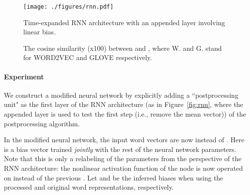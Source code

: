 \documentclass{article} \usepackage{acl2017,times}
\begin{document}
{\begin{figure}[htbp]
\begin{minipage}{0.48\textwidth}
\centering
\texttt{[image: ./figures/rnn.pdf]}
\caption{Time-expanded RNN architecture with an appended layer involving linear bias. \label{fig:rnn}}
\end{minipage}
\begin{minipage}{0.48\textwidth}
\centering
{}
\caption{The cosine similarity (x100) between  and  , where W. and G. stand for WORD2VEC and GLOVE respectively.}
\label{tb:biases}
\end{minipage}
\end{figure}


\paragraph{Experiment} We construct a modified neural network by explicitly adding a ``postprocessing unit" as the first layer of the RNN architecture (as in Figure~\ref{fig:rnn}, where the appended layer is used to test the first step (i.e., remove  the mean vector)) of the  postprocessing algorithm. 

In the modified neural network, the input word vectors are now  instead of . Here   is a bias vector trained {\em jointly} with the rest of the neural network parameters. Note that this is only a relabeling of the parameters from the perspective of the RNN architecture:   the nonlinear activation function of the node is now operated on  instead of the previous . Let  and  be the inferred biases when using  the processed and original word representations, respectively. 

}
\end{document}

